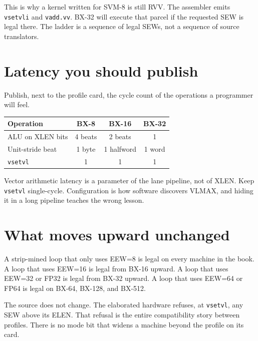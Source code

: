 This is why a kernel written for SVM-8 is still RVV. The assembler emits \texttt{vsetvli} and \texttt{vadd.vv}. BX-32 will execute that parcel if the requested SEW is legal there. The ladder is a sequence of legal SEWs, not a sequence of source translators.

\section{Latency you should publish}

Publish, next to the profile card, the cycle count of the operations a programmer will feel.

\begin{center}
\begin{tabular}{@{}lccc@{}}
\toprule
Operation & BX-8 & BX-16 & BX-32 \\
\midrule
ALU on XLEN bits & 4 beats & 2 beats & 1 \\
Unit-stride beat & 1 byte & 1 halfword & 1 word \\
\texttt{vsetvl} & 1 & 1 & 1 \\
\bottomrule
\end{tabular}
\end{center}

Vector arithmetic latency is a parameter of the lane pipeline, not of XLEN. Keep \texttt{vsetvl} single-cycle. Configuration is how software discovers VLMAX, and hiding it in a long pipeline teaches the wrong lesson.

\section{What moves upward unchanged}

A strip-mined loop that only uses EEW=8 is legal on every machine in the book. A loop that uses EEW=16 is legal from BX-16 upward. A loop that uses EEW=32 or FP32 is legal from BX-32 upward. A loop that uses EEW=64 or FP64 is legal on BX-64, BX-128, and BX-512.

The source does not change. The elaborated hardware refuses, at \texttt{vsetvl}, any SEW above its ELEN. That refusal is the entire compatibility story between profiles. There is no mode bit that widens a machine beyond the profile on its card.
